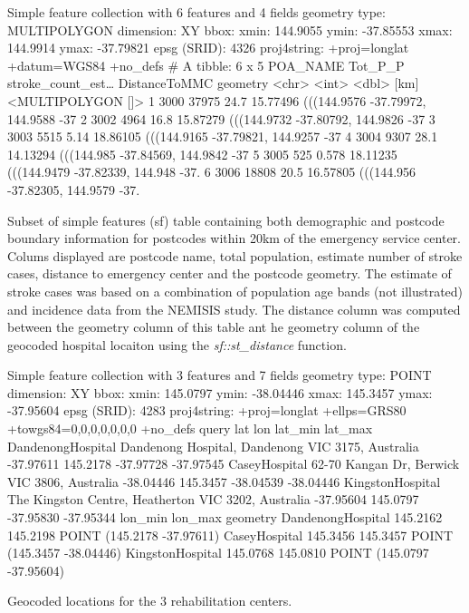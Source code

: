 \documentclass[utf8]{frontiersHLTH}
\begin{document}
\begin{table}[h]
\begin{verbnobox}[\fontsize{6pt}{6pt}\selectfont]
Simple feature collection with 6 features and 4 fields
geometry type:  MULTIPOLYGON
dimension:      XY
bbox:           xmin: 144.9055 ymin: -37.85553 xmax: 144.9914 ymax: -37.79821
epsg (SRID):    4326
proj4string:    +proj=longlat +datum=WGS84 +no_defs
# A tibble: 6 x 5
  POA_NAME Tot_P_P stroke_count_est… DistanceToMMC                             geometry
  <chr>      <int>             <dbl>          [km]                   <MULTIPOLYGON []>
1 3000       37975            24.7        15.77496 (((144.9576 -37.79972, 144.9588 -37
2 3002        4964            16.8        15.87279 (((144.9732 -37.80792, 144.9826 -37
3 3003        5515             5.14       18.86105 (((144.9165 -37.79821, 144.9257 -37
4 3004        9307            28.1        14.13294 (((144.985 -37.84569, 144.9842 -37
5 3005         525             0.578      18.11235 (((144.9479 -37.82339, 144.948 -37.
6 3006       18808            20.5        16.57805 (((144.956 -37.82305, 144.9579 -37.
\end{verbnobox}
\caption{Subset of simple features (sf) table containing both demographic and postcode boundary information for postcodes within 20km of the emergency service center. Colums displayed are postcode name, total population, estimate number of stroke cases, distance to emergency center and the postcode geometry. The estimate of stroke cases was based on a combination of population age bands (not illustrated) and incidence data from the NEMISIS study. The distance column was computed between the geometry column of this table ant he geometry column of the geocoded hospital locaiton using the {\em sf::st\_distance} function.\label{tab:MMC20}}
\end{table}

\begin{table}[h]
\begin{verbnobox}[\fontsize{6pt}{6pt}\selectfont]
Simple feature collection with 3 features and 7 fields
geometry type:  POINT
dimension:      XY
bbox:           xmin: 145.0797 ymin: -38.04446 xmax: 145.3457 ymax: -37.95604
epsg (SRID):    4283
proj4string:    +proj=longlat +ellps=GRS80 +towgs84=0,0,0,0,0,0,0 +no_defs
                                                                query       lat      lon   lat_min   lat_max
DandenongHospital   Dandenong Hospital, Dandenong VIC 3175, Australia -37.97611 145.2178 -37.97728 -37.97545
CaseyHospital            62-70 Kangan Dr, Berwick VIC 3806, Australia -38.04446 145.3457 -38.04539 -38.04446
KingstonHospital  The Kingston Centre, Heatherton VIC 3202, Australia -37.95604 145.0797 -37.95830 -37.95344
                   lon_min  lon_max                   geometry
DandenongHospital 145.2162 145.2198 POINT (145.2178 -37.97611)
CaseyHospital     145.3456 145.3457 POINT (145.3457 -38.04446)
KingstonHospital  145.0768 145.0810 POINT (145.0797 -37.95604)
\end{verbnobox}
\caption{Geocoded locations for the 3 rehabilitation centers.\label{tab:georehab}}
\end{table}
\end{document}
